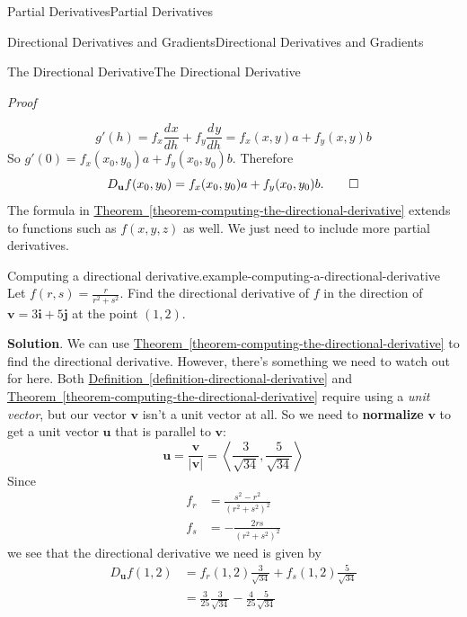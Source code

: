 \documentclass[10pt,]{book}
\makeatletter
\newcommand{\terminology}[1]{\textbf{#1}}
\renewcommand*{\proofname}{Proof}
\renewenvironment{proof}[1][\proofname]{\par
  \pushQED{\qed}%
  \normalfont \topsep6\p@\@plus6\p@\relax
  \trivlist
  \item\relax
    {\itshape
    #1\@addpunct{.}}\hspace\labelsep\ignorespaces
}{%
  \popQED\endtrivlist\@endpefalse
}
\numberwithin{equation}{section}
\newcommand{\vv}[1]{\mathbf{#1}}
\newcommand{\dv}[3][]{\dfrac{d^{#1} #2}{d #3^{#1}}}
\newcommand{\dotprod}[1]{\left\langle #1 \right\rangle}
\makeatother
\begin{document}
\begin{chapterptx}{Partial Derivatives}{}{Partial Derivatives}{}{}
\begin{sectionptx}{Directional Derivatives and Gradients}{}{Directional Derivatives and Gradients}{}{}
\begin{subsectionptx}{The Directional Derivative}{}{The Directional Derivative}{}{}
\begin{proof}
\begin{equation*}
g'(h) = f_{x}\dv{x}{h} + f_{y}\dv{y}{h} = f_{x}(x,y)a + f_{y}(x,y)b
\end{equation*}
So \(g'(0) = f_{x}(x_{0},y_{0})a + f_{y}(x_{0},y_{0})b.\) Therefore%
\begin{equation*}
D_{\vv{u}}f(x_{0},y_{0}) = f_{x}(x_{0},y_{0})a + f_{y}(x_{0},y_{0})b.\qedhere
\end{equation*}
%
\end{proof}
\hypertarget{p-1184}{}%
The formula in \hyperref[theorem-computing-the-directional-derivative]{Theorem~\ref{theorem-computing-the-directional-derivative}} extends to functions such as \(f(x,y,z)\) as well. We just need to include more partial derivatives.%
\begin{example}{Computing a directional derivative.}{example-computing-a-directional-derivative}%
\hypertarget{p-1185}{}%
Let \(f(r,s) = \frac{r}{r^{2}+s^{2}}\). Find the directional derivative of \(f\) in the direction of \(\vv{v} = 3\vv{i} + 5\vv{j}\) at the point \((1,2)\).%
\par\smallskip%
\noindent\textbf{Solution}.\hypertarget{solution-185}{}\quad%
\hypertarget{p-1186}{}%
We can use \hyperref[theorem-computing-the-directional-derivative]{Theorem~\ref{theorem-computing-the-directional-derivative}} to find the directional derivative. However, there's something we need to watch out for here. Both \hyperref[definition-directional-derivative]{Definition~\ref{definition-directional-derivative}} and \hyperref[theorem-computing-the-directional-derivative]{Theorem~\ref{theorem-computing-the-directional-derivative}} require using a \emph{unit vector}, but our vector \(\vv{v}\) isn't a unit vector at all. So we need to \terminology{normalize} \(\vv{v}\) to get a unit vector \(\vv{u}\) that is parallel to \(\vv{v}\):%
\begin{equation*}
\vv{u} = \frac{\vv{v}}{|\vv{v}|} = \dotprod{\frac{3}{\sqrt{34}}, \frac{5}{\sqrt{34}}}
\end{equation*}
Since%
\begin{align*}
f_{r} & = \frac{s^{2} - r^{2}}{(r^{2} + s^{2})^{2}} \\
f_{s} & = -\frac{2rs}{(r^{2} + s^{2})^{2}} 
\end{align*}
we see that the directional derivative we need is given by%
\begin{align*}
D_{\vv{u}}f(1,2) & = f_{r}(1,2)\frac{3}{\sqrt{34}} + f_{s}(1,2)\frac{5}{\sqrt{34}} \\
& = \frac{3}{25}\frac{3}{\sqrt{34}} - \frac{4}{25}\frac{5}{\sqrt{34}} 
\end{align*}

\end{example}
\end{subsectionptx}
\end{sectionptx}
\end{chapterptx}
\end{document}
